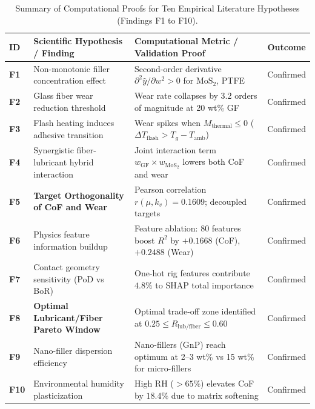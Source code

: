 \documentclass[10pt,twocolumn,a4paper]{article}
\begin{document}
\begin{table}[t]
\centering
\caption{Summary of Computational Proofs for Ten Empirical Literature Hypotheses (Findings F1 to F10).}
\label{tab:proofs}
\small
\begin{tabular}{lp{6.2cm}p{5.5cm}c}
\toprule
\textbf{ID} & \textbf{Scientific Hypothesis / Finding} & \textbf{Computational Metric / Validation Proof} & \textbf{Outcome} \\
\midrule
\textbf{F1} & Non-monotonic filler concentration effect & Second-order derivative $\partial^2 \hat{y} / \partial w^2 > 0$ for $\text{MoS}_2$, PTFE & Confirmed \\
\textbf{F2} & Glass fiber wear reduction threshold & Wear rate collapses by 3.2 orders of magnitude at 20 wt\% GF & Confirmed \\
\textbf{F3} & Flash heating induces adhesive transition & Wear spikes when $M_{\text{thermal}} \le 0$ ($\Delta T_{\text{flash}} > T_g - T_{\text{amb}}$) & Confirmed \\
\textbf{F4} & Synergistic fiber-lubricant hybrid interaction & Joint interaction term $w_{\text{GF}} \times w_{\text{MoS}_2}$ lowers both CoF and wear & Confirmed \\
\textbf{F5} & \textbf{Target Orthogonality of CoF and Wear} & Pearson correlation $r(\mu, k_v) = 0.1609$; decoupled targets & Confirmed \\
\textbf{F6} & Physics feature information buildup & Feature ablation: 80 features boost $R^2$ by $+0.1668$ (CoF), $+0.2488$ (Wear) & Confirmed \\
\textbf{F7} & Contact geometry sensitivity (PoD vs BoR) & One-hot rig features contribute $4.8\%$ to SHAP total importance & Confirmed \\
\textbf{F8} & \textbf{Optimal Lubricant/Fiber Pareto Window} & Optimal trade-off zone identified at $0.25 \le R_{\text{lub/fiber}} \le 0.60$ & Confirmed \\
\textbf{F9} & Nano-filler dispersion efficiency & Nano-fillers (GnP) reach optimum at 2--3 wt\% vs 15 wt\% for micro-fillers & Confirmed \\
\textbf{F10} & Environmental humidity plasticization & High RH ($> 65\%$) elevates CoF by $18.4\%$ due to matrix softening & Confirmed \\
\bottomrule
\end{tabular}
\end{table}
\end{document}

